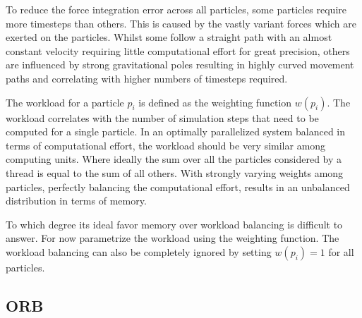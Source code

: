 \documentclass[]{article}
\begin{document}
To reduce the force integration error across all particles, some particles require more timesteps than others. This is caused by the vastly variant forces which are exerted on the particles. Whilst some follow a straight path with an almost constant velocity requiring little computational effort for great precision, others are influenced by strong gravitational poles resulting in highly curved movement paths and correlating with higher numbers of timesteps required.

The workload for a particle $p_i$ is defined as the weighting function $w(p_i)$. The workload correlates with the number of simulation steps that need to be computed for a single particle. In an optimally parallelized system balanced in terms of computational effort, the workload should be very similar among computing units. Where ideally the sum over all the particles considered by a thread is equal to the sum of all others. With strongly varying weights among particles, perfectly balancing the computational effort, results in an unbalanced distribution in terms of memory. 

\begin{comment}
Lets consider a simple example to illustrate the point. Given the set of particles $A = \{p_1, p_2, .., p_{2m/3}\}$ and respectively $B = \{p_{2m/3 + 1}, p_2, .., p_{m}\}$. This yields a total number of particles equivalent to $N = m$. Assuming that $\forall p \in A : w(p) = 1$ and $\forall p \in B : w(p) = 2$. 
All particles from set $A$ are assigned to processor rank 0 and the particles from B to rank 1. It follows $\sum_{p\in A} w(p) = \sum_{p\in B} w(p)$. Thus the two processors are balanced in terms of computing costs, but not in terms of memory size. In fact, process with rank 0 has $2m/3$ elements and rank 1 has $m/3$ elements. Assuming each process has a memory size of $2m/3$, then clearly this configuration is not optimal. When favoring memory balancing, $2m/3$ could be assigned to each processor and $(4/3) \times m$ as many particles could be processed in total, which is larger than the original $N$ and therefore favorable.
\end{comment}

To which degree its ideal favor memory over workload balancing is difficult to answer. For now parametrize the workload using the weighting function. The workload balancing can also be completely ignored by setting $w(p_i) = 1$ for all particles.

\subsection{ORB}
\end{document}
